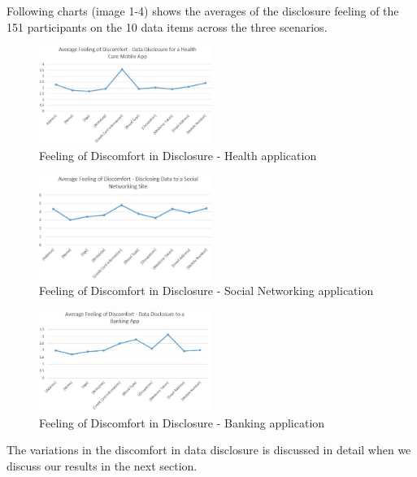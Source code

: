 \documentclass[conference]{IEEEtran}
\begin{document}
Following charts (image 1-4) shows the averages of the disclosure feeling of the 151 participants on the 10 data items across the three scenarios.

\begin{figure}[h]
\begin{center}
\includegraphics[width=0.5\textwidth]{Average_Health}
\caption{Feeling of Discomfort in Disclosure - Health  application}
\end{center}
\end{figure}

\begin{figure}[h]
\begin{center}
\includegraphics[width=0.5\textwidth]{Average_SocialNetworking}
\caption{Feeling of Discomfort in Disclosure - Social Networking application}
\end{center}
\end{figure}

\begin{figure}[h]
\begin{center}
\includegraphics[width=0.5\textwidth]{Average_Banking}
\caption{Feeling of Discomfort in Disclosure - Banking application}
\end{center}
\end{figure}

The variations in the discomfort in data disclosure is discussed in detail when we discuss our results in the next section.
\end{document}
